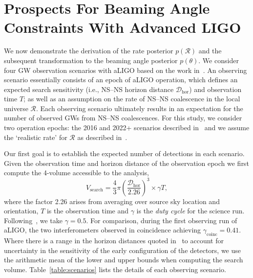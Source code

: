 \documentclass[twocolumn,nofootinbib]{revtex4-1}
\newcommand{\cbcrate}{{{\mathcal R}}}
\newcommand{\dhor}{{\mathcal D}_{\mathrm{hor}}}
\newcommand{\BNS}{\ac{NS}--\ac{NS}\xspace}
\begin{document}
\section{Prospects For Beaming Angle Constraints With Advanced LIGO}
We now demonstrate the derivation of the rate posterior $p(\cbcrate)$ and the subsequent transformation to the beaming angle posterior $p(\theta)$.
We consider four \ac{GW} observation scenarios with \ac{aLIGO} based on the work in~\cite{Aasi:2013wya}.
An observing scenario essentially consists of an epoch of \ac{aLIGO} operation, which defines an expected search sensitivity (i.e., \BNS horizon distance $\dhor$) and observation time $T$; as well as an assumption on the rate of \BNS coalescence in the local universe $\cbcrate$.
Each observing scenario ultimately results in an expectation for the number of observed \acp{GW} from \BNS coalescences.
For this study, we consider two operation epochs: the 2016 and 2022+ scenarios described in~\cite{Aasi:2013wya} and we assume the `realistic rate' for $\cbcrate$ as described in~\cite{rates_paper}.

Our first goal is to establish the expected number of detections in each scenario.
Given the observation time and horizon distance of the observation epoch we first compute the 4-volume accessible to the analysis,
%
\begin{equation}
    \label{eq:search_volume}
    V_{\mathrm{search}} = \frac{4}{3}\pi \left(\frac{\dhor}{2.26}\right)^3 \times \gamma T,
\end{equation}
%
where the factor 2.26 arises from averaging over source sky location and orientation, $T$ is the observation time and $\gamma$ is the \emph{duty cycle} for the science run.
Following~\cite{Aasi:2013wya}, we take $\gamma=0.5$.
For comparison, during the first observing run of \ac{aLIGO}, the two interferometers observed in coincidence achieving $\gamma_{\mathrm{coinc}} = 0.41$.
Where there is a range in the horizon distances quoted in~\cite{Aasi:2013wya} to account for uncertainty in the sensitivity of the early configuration of the detectors, we use the arithmetic mean of the lower and upper bounds when computing the search volume.
Table~\ref{table:scenarios} lists the details of each observing scenario.
\end{document}
